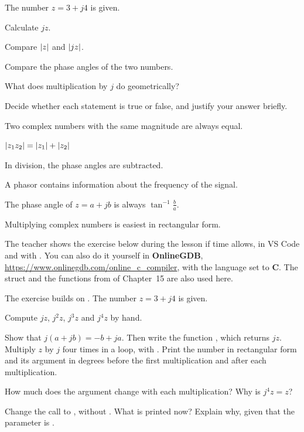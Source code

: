 The number $z = 3 + j4$ is given.
\begin{parts}
  \item Calculate $jz$.
  \item Compare $\lvert z\rvert$ and $\lvert jz\rvert$.
  \item Compare the phase angles of the two numbers.
  \item What does multiplication by $j$ do geometrically?
\end{parts}

Decide whether each statement is true or false, and justify your answer briefly.
\begin{parts}
  \item Two complex numbers with the same magnitude are always equal.
  \item $\lvert z_1z_2\rvert = \lvert z_1\rvert + \lvert z_2\rvert$
  \item In division, the phase angles are subtracted.
  \item A phasor contains information about the frequency of the signal.
  \item The phase angle of $z = a + jb$ is always $\tan^{-1}\frac{b}{a}$.
  \item Multiplying complex numbers is easiest in rectangular form.
\end{parts}

The teacher shows the exercise below during the lesson if time allows, in VS Code and with
. You can
also do it yourself in \textbf{OnlineGDB}, \url{https://www.onlinegdb.com/online_c_compiler}, with
the language set to \textbf{C}. The struct  and the functions from 
of Chapter~15 are also used here.

The exercise builds on . The number $z = 3 + j4$ is given.
\begin{parts}
  \item Compute $jz$, $j^2 z$, $j^3 z$ and $j^4 z$ by hand.
  \item Show that $j(a + jb) = -b + ja$. Then write the function , which returns $jz$. Multiply $z$ by $j$ four times in a
    loop, with . Print the number in rectangular form and its
    argument in degrees before the first multiplication and after each multiplication.
  \item How much does the argument change with each multiplication? Why is $j^4 z = z$?
  \item Change the call to , without . What is printed now?
    Explain why, given that the parameter is .
\end{parts}
